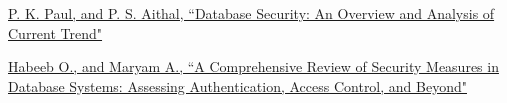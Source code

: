 \documentclass[12pt]{book} %
\begin{document}
\renewcommand\bibname{References} %
\begin{thebibliography}{1}

      \hyperref[sec:db_security_an_overview_and_analysis_of_current_trend_1]{P. K. Paul, and P. S. Aithal, ``Database Security: An Overview and Analysis of Current Trend"} 

      \hyperref[sec:a_comprve_rev_of_sec_measr_in_db_sys_assess_auth_accss_ctrl_bynd_1]{Habeeb O., and Maryam A., ``A Comprehensive Review of Security Measures in Database Systems: Assessing Authentication, Access Control, and Beyond"} 

   

    
    
    
    
    
  
\end{thebibliography}
  
\end{document}
